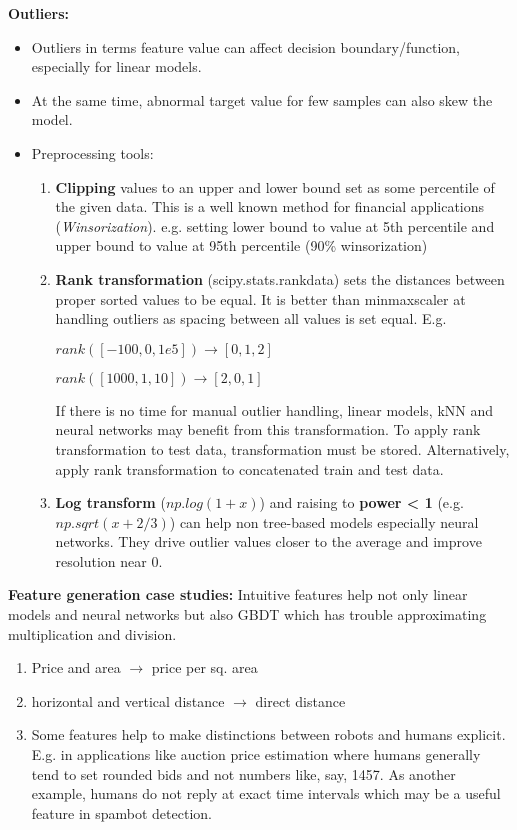 \documentclass[a4paper]{article}
\begin{document}
\textbf{Outliers:}
\begin{itemize}
\item Outliers in terms feature value can affect decision boundary/function, especially for linear models.
\item At the same time, abnormal target value for few samples can also skew the model.
\item Preprocessing tools:
	\begin{enumerate}
	\item \textbf{Clipping} values to an upper and lower bound set as some percentile of the given data. This is a well known method for financial applications (\textit{Winsorization}). e.g. setting lower bound to value at 5th percentile and upper bound to value at 95th percentile (90\% winsorization)
	\item \textbf{Rank transformation} (scipy.stats.rankdata) sets the distances between proper sorted values to be equal. It is better than minmaxscaler at handling outliers as spacing between all values is set equal. E.g.
		
		$rank([-100,0,1e5]) \rightarrow [0,1,2]$

		$rank([1000,1,10]) \rightarrow [2,0,1]$
		
		If there is no time for manual outlier handling, linear models, kNN and neural networks may benefit from this transformation. To apply rank transformation to test data, transformation must be stored. Alternatively, apply rank transformation to concatenated train and test data.
	\item \textbf{Log transform} ($np.log(1+x)$) and raising to \textbf{power < 1} (e.g. $np.sqrt(x + 2/3)$) can help non tree-based models especially neural networks. They drive outlier values closer to the average and improve resolution near 0.
	\end{enumerate}
\end{itemize}

\textbf{Feature generation case studies:}
Intuitive features help not only linear models and neural networks but also GBDT which has trouble approximating multiplication and division.
\begin{enumerate}
\item Price and area $\rightarrow$ price per sq. area
\item horizontal and vertical distance $\rightarrow$ direct distance
\item Some features help to make distinctions between robots and humans explicit. E.g. in applications like auction price estimation where humans generally tend to set rounded bids and not numbers like, say, 1457. As another example, humans do not reply at exact time intervals which may be a useful feature in spambot detection.
\end{enumerate}
\end{document}
